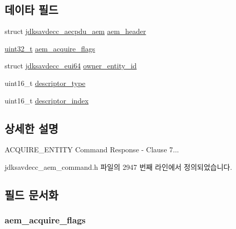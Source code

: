 \subsection*{데이타 필드}
\begin{DoxyCompactItemize}
\item 
struct \hyperlink{structjdksavdecc__aecpdu__aem}{jdksavdecc\+\_\+aecpdu\+\_\+aem} \hyperlink{structjdksavdecc__aem__command__acquire__entity__response_ae1e77ccb75ff5021ad923221eab38294}{aem\+\_\+header}
\item 
\hyperlink{parse_8c_a6eb1e68cc391dd753bc8ce896dbb8315}{uint32\+\_\+t} \hyperlink{structjdksavdecc__aem__command__acquire__entity__response_a1c1fa98ce0106469b3eff2aac33cea93}{aem\+\_\+acquire\+\_\+flags}
\item 
struct \hyperlink{structjdksavdecc__eui64}{jdksavdecc\+\_\+eui64} \hyperlink{structjdksavdecc__aem__command__acquire__entity__response_aae4e95a44a1a5e23f8e4415c32aed989}{owner\+\_\+entity\+\_\+id}
\item 
uint16\+\_\+t \hyperlink{structjdksavdecc__aem__command__acquire__entity__response_ab7c32b6c7131c13d4ea3b7ee2f09b78d}{descriptor\+\_\+type}
\item 
uint16\+\_\+t \hyperlink{structjdksavdecc__aem__command__acquire__entity__response_a042bbc76d835b82d27c1932431ee38d4}{descriptor\+\_\+index}
\end{DoxyCompactItemize}


\subsection{상세한 설명}
A\+C\+Q\+U\+I\+R\+E\+\_\+\+E\+N\+T\+I\+TY Command Response -\/ Clause 7... 

jdksavdecc\+\_\+aem\+\_\+command.\+h 파일의 2947 번째 라인에서 정의되었습니다.



\subsection{필드 문서화}
\subsubsection[{\texorpdfstring{aem\+\_\+acquire\+\_\+flags}{aem_acquire_flags}}]{ aem\+\_\+acquire\+\_\+flags}\hypertarget{structjdksavdecc__aem__command__acquire__entity__response_a1c1fa98ce0106469b3eff2aac33cea93}{}\label{structjdksavdecc__aem__command__acquire__entity__response_a1c1fa98ce0106469b3eff2aac33cea93}


